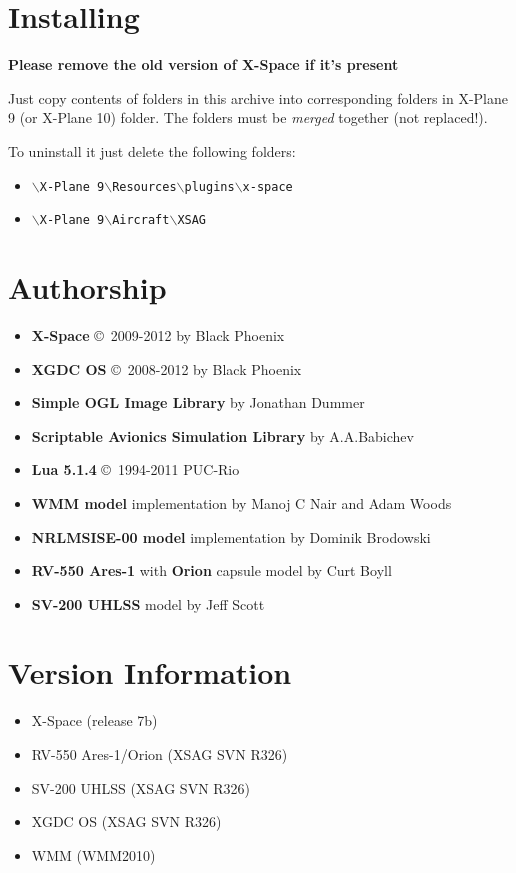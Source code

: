\documentclass{article}
\newcommand{\reg}[1]{\texttt{#1}}
\begin{document}
\twocolumn

\section{Installing}
\textbf{Please remove the old version of X-Space if it's present}

Just copy contents of folders in this archive into corresponding folders in X-Plane 9 (or X-Plane 10) folder. The folders must be \textit{merged} together (not replaced!).

To uninstall it just delete the following folders:
\begin{itemize}
  \item \reg{$\backslash$X-Plane 9$\backslash$Resources$\backslash$plugins$\backslash$x-space}
  \item \reg{$\backslash$X-Plane 9$\backslash$Aircraft$\backslash$XSAG}
\end{itemize}

\section{Authorship}
\begin{itemize}
  \item \textbf{X-Space} \copyright \  2009-2012 by Black Phoenix
  \item \textbf{XGDC OS} \copyright \ 2008-2012  by Black Phoenix
  \item \textbf{Simple OGL Image Library} by Jonathan Dummer
  \item \textbf{Scriptable Avionics Simulation Library} by A.A.Babichev
  \item \textbf{Lua 5.1.4} \copyright \ 1994-2011 PUC-Rio
  \item \textbf{WMM model} implementation by Manoj C Nair and Adam Woods
  \item \textbf{NRLMSISE-00 model} implementation by Dominik Brodowski
  \item \textbf{RV-550 Ares-1} with \textbf{Orion} capsule model by Curt Boyll
  \item \textbf{SV-200 UHLSS} model by Jeff Scott
\end{itemize}

\section{Version Information}
\begin{itemize}
  \item X-Space (release 7b)
  \item RV-550 Ares-1/Orion (XSAG SVN R326)
  \item SV-200 UHLSS (XSAG SVN R326)
  \item XGDC OS (XSAG SVN R326)
  \item WMM (WMM2010)
\end{itemize}
\end{document}
